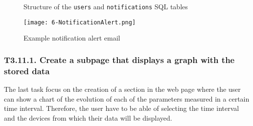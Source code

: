 \begin{figure}[htb]
	\centering
	\caption{Structure of the \texttt{users} and \texttt{notifications} SQL tables}
	\label{fig:6-SQL-users-notifications}
\end{figure}


\begin{figure}[!h]
	\begin{center}
		\texttt{[image: 6-NotificationAlert.png]}
		\caption{Example notification alert email}
		\label{fig:6-NotificationAlert}
	\end{center}
\end{figure}


\subsubsection{T3.11.1. Create a subpage that displays a graph with the stored data}
The last task focus on the creation of a section in the web page where the user can show a chart of the evolution of each of the parameters measured in a certain time interval. Therefore, the user have to be able of selecting the time interval and the devices from which their data will be displayed. 

